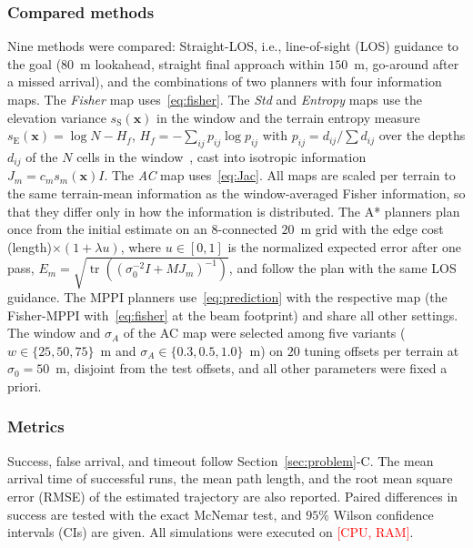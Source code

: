 \documentclass[letterpaper, 10 pt, journal, twoside]{IEEEtran}
\newcommand{\tbd}[1]{\textcolor{red}{#1}}
\DeclareMathOperator{\tr}{tr}
\newcommand{\bx}{\mathbf{x}}
\begin{document}
\subsubsection{Compared methods}
Nine methods were compared: Straight-LOS, i.e., line-of-sight (LOS) guidance to the goal ($80$~m lookahead, straight final approach within $150$~m, go-around after a missed arrival), and the combinations of two planners with four information maps. The \emph{Fisher} map uses~\eqref{eq:fisher}. The \emph{Std} and \emph{Entropy} maps use the elevation variance $s_{\mathrm{S}}(\bx)$ in the window and the terrain entropy measure $s_{\mathrm{E}}(\bx) = \log N - H_f$, $H_f = -\sum_{ij} p_{ij}\log p_{ij}$ with $p_{ij} = d_{ij}/\sum d_{ij}$ over the depths $d_{ij}$ of the $N$ cells in the window~\cite{wang2015construction}, cast into isotropic information $J_m = c_m s_m(\bx) I$. The \emph{AC} map uses~\eqref{eq:Jac}. All maps are scaled per terrain to the same terrain-mean information as the window-averaged Fisher information, so that they differ only in how the information is distributed. The A* planners plan once from the initial estimate on an $8$-connected $20$~m grid with the edge cost (length)$\times(1 + \lambda u)$, where $u \in [0,1]$ is the normalized expected error after one pass, $E_m = \sqrt{\tr((\sigma_0^{-2}I + M J_m)^{-1})}$, and follow the plan with the same LOS guidance. The MPPI planners use~\eqref{eq:prediction} with the respective map (the Fisher-MPPI with~\eqref{eq:fisher} at the beam footprint) and share all other settings. The window and $\sigma_A$ of the AC map were selected among five variants ($w \in \{25, 50, 75\}$~m and $\sigma_A \in \{0.3, 0.5, 1.0\}$~m) on $20$ tuning offsets per terrain at $\sigma_0 = 50$~m, disjoint from the test offsets, and all other parameters were fixed a priori.

\subsubsection{Metrics}
Success, false arrival, and timeout follow Section~\ref{sec:problem}-C. The mean arrival time of successful runs, the mean path length, and the root mean square error (RMSE) of the estimated trajectory are also reported. Paired differences in success are tested with the exact McNemar test, and $95\%$ Wilson confidence intervals (CIs) are given. All simulations were executed on \tbd{[CPU, RAM]}.
\end{document}
